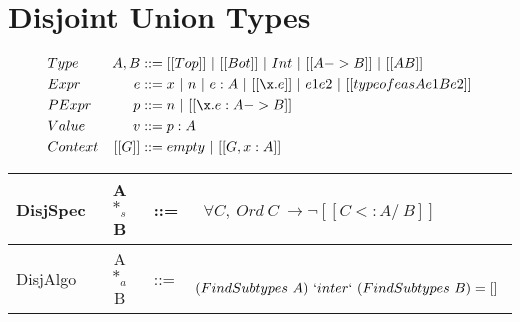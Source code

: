 \section{Disjoint Union Types}
\label{sec:union}


\begin{align*}
&Type &A, B&::= [[Top]] ~ | ~[[Bot]]~|~ Int ~| ~ [[A->B]]~ |~ [[A \/ B]]\\
&Expr &e &::= x ~|~ n ~| ~ e:A ~|~[[\x.e]] ~ | ~ e1e2 ~|~ [[typeof e as A e1 B e2]]\\
&PExpr & p &::= n ~|~ [[\x.e : A->B]] \\
&Value &v &::= p : A \\
&Context & [[G]] &::= empty~ |~ [[G , x : A]]
\end{align*}

     {\renewcommand{\arraystretch}{1.5}
     \begin{center}
     \begin{tabular}{|lcll|}
       \hline
      DisjSpec & A $*_s$ B & ::= & ~$\forall C, ~ Ord ~ C ~ \rightarrow \neg [[C <: A /\ B]]$\\
       \hline
      DisjAlgo & A $*_a$ B & ::= & ~ $(FindSubtypes ~ A) ~ `inter` ~ (FindSubtypes ~ B) = []$ \\
       \hline
     \end{tabular}
     \end{center} }